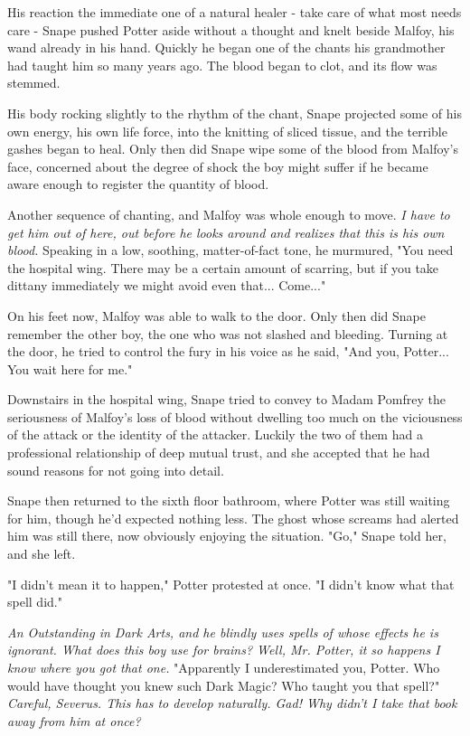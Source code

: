 \documentclass[a4paper,11pt]{article}
\begin{document}
His reaction the immediate one of a natural healer - take care of what most needs care - Snape pushed Potter aside without a thought and knelt beside Malfoy, his wand already in his hand. Quickly he began one of the chants his grandmother had taught him so many years ago. The blood began to clot, and its flow was stemmed.

His body rocking slightly to the rhythm of the chant, Snape projected some of his own energy, his own life force, into the knitting of sliced tissue, and the terrible gashes began to heal. Only then did Snape wipe some of the blood from Malfoy's face, concerned about the degree of shock the boy might suffer if he became aware enough to register the quantity of blood.

Another sequence of chanting, and Malfoy was whole enough to move. \emph{I have to get him out of here, out before he looks around and realizes that this is his own blood.} Speaking in a low, soothing, matter-of-fact tone, he murmured, "You need the hospital wing. There may be a certain amount of scarring, but if you take dittany immediately we might avoid even that... Come..."

On his feet now, Malfoy was able to walk to the door. Only then did Snape remember the other boy, the one who was not slashed and bleeding. Turning at the door, he tried to control the fury in his voice as he said, "And you, Potter... You wait here for me."

Downstairs in the hospital wing, Snape tried to convey to Madam Pomfrey the seriousness of Malfoy's loss of blood without dwelling too much on the viciousness of the attack or the identity of the attacker. Luckily the two of them had a professional relationship of deep mutual trust, and she accepted that he had sound reasons for not going into detail.

Snape then returned to the sixth floor bathroom, where Potter was still waiting for him, though he'd expected nothing less. The ghost whose screams had alerted him was still there, now obviously enjoying the situation. "Go," Snape told her, and she left.

"I didn't mean it to happen," Potter protested at once. "I didn't know what that spell did."

\emph{An Outstanding in Dark Arts, and he blindly uses spells of whose effects he is ignorant. What does this boy use for brains? Well, Mr. Potter, it so happens I know where you got that one.} "Apparently I underestimated you, Potter. Who would have thought you knew such Dark Magic? Who taught you that spell?" \emph{Careful, Severus. This has to develop naturally. Gad! Why didn't I take that book away from him at once?}
\end{document}
